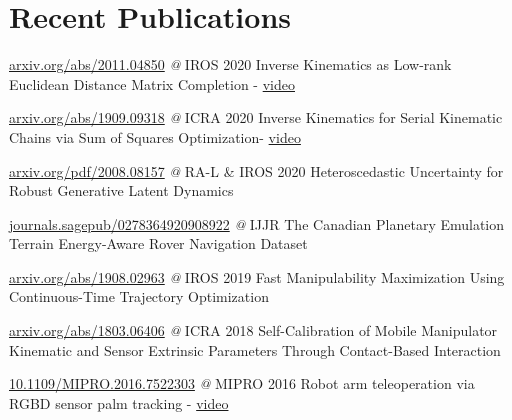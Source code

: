 \documentclass{tccv}
\begin{document}
\section{Recent Publications}

\begin{yearlist2}
\item{}
     {{\small \href{https://arxiv.org/abs/2011.04850}{arxiv.org/abs/2011.04850} \textit{@} IROS 2020}}
     {{\small Inverse Kinematics as Low-rank Euclidean Distance Matrix Completion - \href{https://www.youtube.com/watch?v=wO0_w2Gw5jk}{video}}}

\item{}
     {{\small \href{https://arxiv.org/abs/1909.09318}{arxiv.org/abs/1909.09318} \textit{@} ICRA 2020}}
     {{\small Inverse Kinematics for Serial Kinematic Chains via Sum of Squares Optimization- \href{https://www.youtube.com/watch?v=AdPze8cTUuE}{video}}}

\item{}
     {{\small \href{https://arxiv.org/pdf/2008.08157}{arxiv.org/pdf/2008.08157} \textit{@} RA-L \& IROS 2020}}
     {{\small Heteroscedastic Uncertainty for Robust Generative Latent Dynamics}}

\item{}
     {{\small \href{https://journals.sagepub.com/doi/abs/10.1177/0278364920908922}{journals.sagepub/0278364920908922} \textit{@} IJJR}}
     {{\small The Canadian Planetary Emulation Terrain Energy-Aware Rover Navigation Dataset}}

\item{}
     {{\small \href{https://arxiv.org/abs/1908.02963}{arxiv.org/abs/1908.02963} \textit{@} IROS 2019}}
     {{\small Fast Manipulability Maximization Using Continuous-Time Trajectory Optimization}}
     
\item{}
     {{\small \href{https://arxiv.org/abs/1803.06406}{arxiv.org/abs/1803.06406} \textit{@} ICRA 2018}}
     {{\small Self-Calibration of Mobile Manipulator Kinematic and Sensor Extrinsic Parameters Through Contact-Based Interaction}}

     \item{}
     {{\small \href{https://ieeexplore.ieee.org/document/7522303}{10.1109/MIPRO.2016.7522303} \textit{@} MIPRO 2016}}
     {{\small Robot arm teleoperation via RGBD sensor palm tracking - \href{https://youtu.be/exf7TUviuSg}{video}}}
\end{yearlist2}
\vspace*{-0.5cm}
% 
\end{document}
